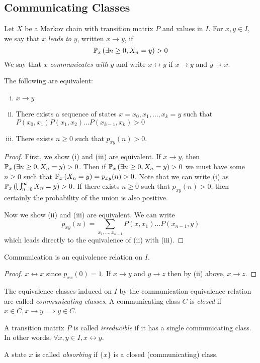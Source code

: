 \subsection{Communicating Classes}
\begin{definition}
	Let \( X \) be a Markov chain with transition matrix \( P \) and values in \( I \).
	For \( x, y \in I \), we say that \( x \) \textit{leads to} \( y \), written \( x \to y \), if
	\[
		\mathbb{P}_{x}\left({\exists n \geq 0, X_n = y}\right) > 0
	\]
	We say that \( x \) \textit{communicates with} \( y \) and write \( x \leftrightarrow y \) if \( x \to y \) and \( y \to x \).
\end{definition}
\begin{theorem}
	The following are equivalent:
	\begin{enumerate}[(i)]
		\item \( x \to y \)
		\item There exists a sequence of states \( x = x_0, x_1, \dots, x_k = y \) such that \( P(x_0, x_1)P(x_1,x_2)\dots P(x_{k-1},x_k) > 0 \)
		\item There exists \( n \geq 0 \) such that \( p_{xy}(n) > 0 \).
	\end{enumerate}
\end{theorem}
\begin{proof}
	First, we show (i) and (iii) are equivalent.
	If \( x \to y \), then \( \mathbb{P}_{x}\left({\exists n \geq 0, X_n = y}\right) > 0 \).
	Then if \( \mathbb{P}_{x}\left({\exists n \geq 0, X_n = y}\right) > 0 \) we must have some \( n \geq 0 \) such that \( \mathbb{P}_{x}\left({X_n = y}\right) = p_{xy}(n) > 0 \).
	Note that we can write (i) as \( \mathbb{P}_{x}\left({\bigcup_{n=0}^\infty X_n = y}\right) > 0 \).
	If there exists \( n \geq 0 \) such that \( p_{xy}(n) > 0 \), then certainly the probability of the union is also positive.

	Now we show (ii) and (iii) are equivalent.
	We can write
	\[
		p_{xy}(n) = \sum_{x_1, \dots, x_{n-1}} P(x, x_1) \dots P(x_{n-1}, y)
	\]
	which leads directly to the equivalence of (ii) with (iii).
\end{proof}
\begin{corollary}
	Communication is an equivalence relation on \( I \).
\end{corollary}
\begin{proof}
	\( x \leftrightarrow x \) since \( p_{xx}(0) = 1 \).
	If \( x \to y \) and \( y \to z \) then by (ii) above, \( x \to z \).
\end{proof}
\begin{definition}
	The equivalence classes induced on \( I \) by the communication equivalence relation are called \textit{communicating classes}.
	A communicating class \( C \) is \textit{closed} if \( x \in C, x \to y \implies y \in C \).
\end{definition}
\begin{definition}
	A transition matrix \( P \) is called \textit{irreducible} if it has a single communicating class.
	In other words, \( \forall x, y \in I, x \leftrightarrow y \).
\end{definition}
\begin{definition}
	A state \( x \) is called \textit{absorbing} if \( \{ x \} \) is a closed (communicating) class.
\end{definition}

